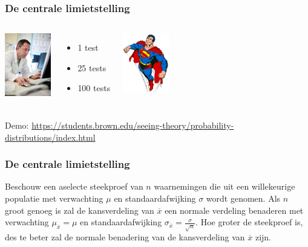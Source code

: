 \documentclass{beamer}
\begin{document}
\begin{frame}
  \frametitle{De centrale limietstelling}


  \vfill

  \begin{columns}[c]
    \includegraphics[width=2cm]{img/les4-centrlimiet}
    \begin{itemize}
      \item 1 test
      \item 25 tests
      \item 100 tests
    \end{itemize}
    \includegraphics[width=2cm]{img/les2-hero-3}
  \end{columns}

Demo: \url{https://students.brown.edu/seeing-theory/probability-distributions/index.html}

\end{frame}

\begin{frame}
  \frametitle{De centrale limietstelling}
  Beschouw een aselecte steekproef van $n$ waarnemingen die uit een willekeurige populatie met verwachting $\mu$ en standaardafwijking $\sigma$ wordt genomen. Als $n$ groot genoeg is zal de kansverdeling van $\overline{x}$ een normale verdeling benaderen met verwachting $\mu_{\overline{x}} = \mu$ en standaardafwijking $\sigma_{\overline{x}} = \frac{\sigma}{\sqrt{n}}$. Hoe groter de steekproef is, des te beter zal de normale benadering van de kansverdeling van $\overline{x}$ zijn.
\end{frame}
\end{document}
